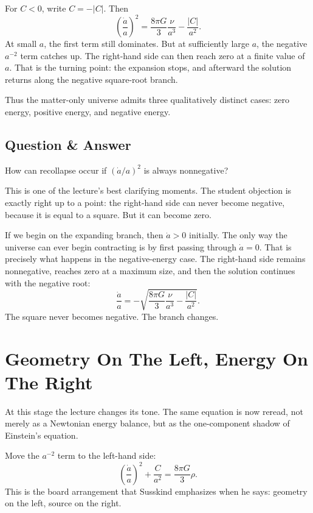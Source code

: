 For \(C<0\), write \(C=-|C|\). Then
\begin{equation}
\left(\frac{\dot a}{a}\right)^2
=
\frac{8\pi G}{3}\frac{\nu}{a^3}
-
\frac{|C|}{a^2}.
\end{equation}
At small \(a\), the first term still dominates. But at sufficiently large \(a\), the negative \(a^{-2}\) term catches up. The right-hand side can then reach zero at a finite value of \(a\). That is the turning point: the expansion stops, and afterward the solution returns along the negative square-root branch.

Thus the matter-only universe admits three qualitatively distinct cases: zero energy, positive energy, and negative energy.

\subsection{Question \& Answer}

How can recollapse occur if \(\left(\dot a/a\right)^2\) is always nonnegative?

This is one of the lecture's best clarifying moments. The student objection is exactly right up to a point: the right-hand side can never become negative, because it is equal to a square. But it can become zero.

If we begin on the expanding branch, then \(\dot a>0\) initially. The only way the universe can ever begin contracting is by first passing through \(\dot a=0\). That is precisely what happens in the negative-energy case. The right-hand side remains nonnegative, reaches zero at a maximum size, and then the solution continues with the negative root:
\begin{equation}
\frac{\dot a}{a}=-\sqrt{\frac{8\pi G}{3}\frac{\nu}{a^3}-\frac{|C|}{a^2}}.
\end{equation}
The square never becomes negative. The branch changes.

\section{Geometry On The Left, Energy On The Right}

At this stage the lecture changes its tone. The same equation is now reread, not merely as a Newtonian energy balance, but as the one-component shadow of Einstein's equation.

Move the \(a^{-2}\) term to the left-hand side:
\begin{equation}
\left(\frac{\dot a}{a}\right)^2+\frac{C}{a^2}=\frac{8\pi G}{3}\rho.
\end{equation}
This is the board arrangement that Susskind emphasizes when he says: geometry on the left, source on the right.

